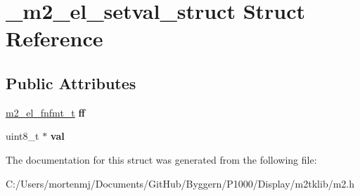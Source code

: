 \hypertarget{struct__m2__el__setval__struct}{\section{\-\_\-m2\-\_\-el\-\_\-setval\-\_\-struct Struct Reference}
\label{struct__m2__el__setval__struct}
}
\subsection*{Public Attributes}
\begin{DoxyCompactItemize}
\item 
\hypertarget{struct__m2__el__setval__struct_a6729a26ad528035963c6b71c3fb69b2b}{\hyperlink{struct__m2__el__fnfmt__struct}{m2\-\_\-el\-\_\-fnfmt\-\_\-t} {\bfseries ff}}\label{struct__m2__el__setval__struct_a6729a26ad528035963c6b71c3fb69b2b}

\item 
\hypertarget{struct__m2__el__setval__struct_ab4e6cef31acadef22e548d1c9dffdf45}{uint8\-\_\-t $\ast$ {\bfseries val}}\label{struct__m2__el__setval__struct_ab4e6cef31acadef22e548d1c9dffdf45}

\end{DoxyCompactItemize}


The documentation for this struct was generated from the following file\-:\begin{DoxyCompactItemize}
\item 
C\-:/\-Users/mortenmj/\-Documents/\-Git\-Hub/\-Byggern/\-P1000/\-Display/m2tklib/m2.\-h\end{DoxyCompactItemize}
